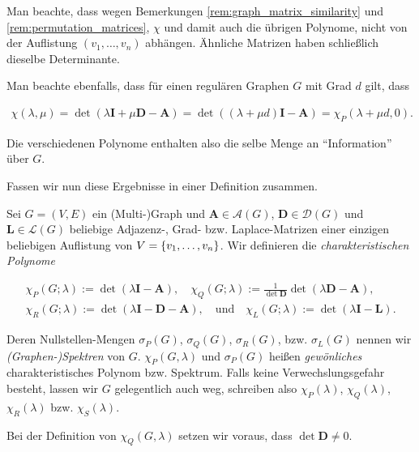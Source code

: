 \begin{remark}
            Man beachte, dass wegen Bemerkungen \ref{rem:graph_matrix_similarity} und \ref{rem:permutation_matrices}, $\chi$ und damit auch die übrigen Polynome, nicht von der Auflistung $(v_1, \dots, v_n)$ abhängen.
            Ähnliche Matrizen haben schließlich dieselbe Determinante.

            Man beachte ebenfalls, dass für einen regulären Graphen $G$ mit Grad $d$ gilt, dass

            \begin{align*}
                \chi(\lambda, \mu)
                =
                \det(\lambda \mathbf I + \mu \mathbf D - \mathbf A)
                =
                \det((\lambda + \mu d) \mathbf I - \mathbf A)
                =
                \chi_P(\lambda + \mu d, 0).
            \end{align*}

            Die verschiedenen Polynome enthalten also die selbe Menge an \enquote{Information} über $G$.

        \end{remark}

        Fassen wir nun diese Ergebnisse in einer Definition zusammen.

        \begin{definition} \label{def:graph_characteristic_polynomials_and_spectra}

            Sei $G = (V, E)$ ein (Multi-)Graph und $\mathbf A \in \mathcal A(G)$, $\mathbf D \in \mathcal D(G)$ und $\mathbf L \in \mathcal L(G)$ beliebige Adjazenz-, Grad- bzw. Laplace-Matrizen einer einzigen beliebigen Auflistung von $V = {\left \{ v_1, \dots, v_n \right \}}$.
            Wir definieren die \textit{charakteristischen Polynome}

            \begin{gather*}
                \chi_P(G; \lambda) := \det(\lambda \mathbf I - \mathbf A),
                \quad
                \chi_Q(G; \lambda) := \frac{1}{\det \mathbf D} \det(\lambda \mathbf D - \mathbf A), \\
                \chi_R(G; \lambda) := \det(\lambda \mathbf I - \mathbf D - \mathbf A),
                \quad
                \text{und}
                \quad
                \chi_L(G; \lambda) := \det(\lambda \mathbf I - \mathbf L).
            \end{gather*}

            Deren Nullstellen-Mengen $\sigma_P(G)$, $\sigma_Q(G)$, $\sigma_R(G)$, bzw. $\sigma_L(G)$ nennen wir \textit{(Graphen-)Spektren} von $G$.
            $\chi_P(G, \lambda)$ und $\sigma_P(G)$ heißen \textit{gewönliches} charakteristisches Polynom bzw. Spektrum.
            Falls keine Verwechslungsgefahr besteht, lassen wir $G$ gelegentlich auch weg, schreiben also $\chi_P(\lambda)$, $\chi_Q(\lambda)$, $\chi_R(\lambda)$ bzw. $\chi_S(\lambda)$.

            Bei der Definition von $\chi_Q(G, \lambda)$ setzen wir voraus, dass $\det \mathbf D \neq 0$.

        \end{definition}

